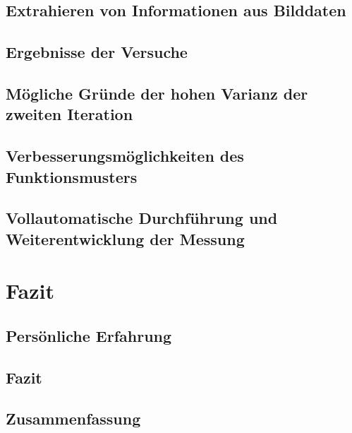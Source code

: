 \documentclass[a4paper,12pt]{article}
\begin{document}
\subsection{Extrahieren von Informationen aus Bilddaten}
\label{sec:DB}



\newpage
\subsection{Ergebnisse der Versuche}


\subsection{Mögliche Gründe der hohen Varianz der zweiten Iteration}

%

\subsection{Verbesserungsmöglichkeiten des Funktionsmusters}

\newpage
\subsection{Vollautomatische Durchführung und Weiterentwicklung der Messung}


\newpage
\section{Fazit}
%

\subsection{Persönliche Erfahrung}


\subsection{Fazit}


\subsection{Zusammenfassung}

\end{document}
